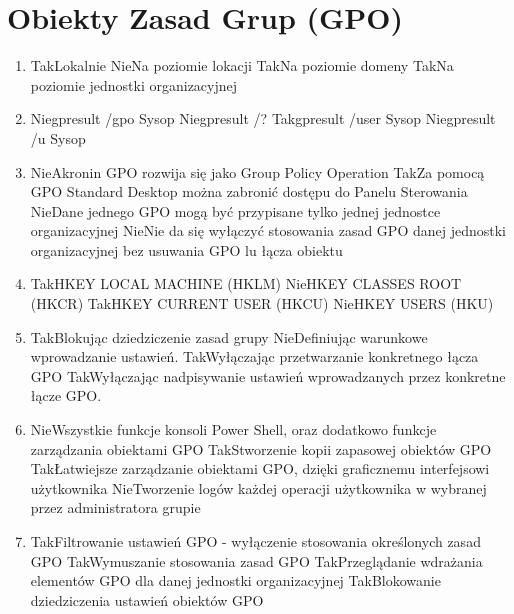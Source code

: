 \newpage
\section{Obiekty Zasad Grup (GPO)}
	\begin{enumerate}
		\item {}%
		{Tak}{Lokalnie}%
		{Nie}{Na poziomie lokacji}%
		{Tak}{Na poziomie domeny}%
		{Tak}{Na poziomie jednostki organizacyjnej}%
		
		\item {}%
		{Nie}{gpresult /gpo Sysop}%
		{Nie}{gpresult /?}%
		{Tak}{gpresult /user Sysop}%
		{Nie}{gpresult /u Sysop}
		
		\item {}%
		{Nie}{Akronin GPO rozwija się jako Group Policy Operation}%
		{Tak}{Za pomocą GPO Standard Desktop można zabronić dostępu do Panelu Sterowania}%
		{Nie}{Dane jednego GPO mogą być przypisane tylko jednej jednostce organizacyjnej}%
		{Nie}{Nie da się wyłączyć stosowania zasad GPO danej jednostki organizacyjnej bez usuwania GPO lu łącza obiektu}
		
		\item {}%
		{Tak}{HKEY LOCAL MACHINE (HKLM)}%
		{Nie}{HKEY CLASSES ROOT (HKCR)}%
		{Tak}{HKEY CURRENT USER (HKCU)}%
		{Nie}{HKEY USERS (HKU)}
		
		\item {}%
		{Tak}{Blokując dziedziczenie zasad grupy}%
		{Nie}{Definiując warunkowe wprowadzanie ustawień.}%
		{Tak}{Wyłączając przetwarzanie konkretnego łącza GPO}%
		{Tak}{Wyłączając nadpisywanie ustawień wprowadzanych przez konkretne łącze GPO.}
		
		\item {}%
		{Nie}{Wszystkie funkcje konsoli Power Shell, oraz dodatkowo funkcje zarządzania obiektami GPO}%
		{Tak}{Stworzenie kopii zapasowej obiektów GPO}%
		{Tak}{Łatwiejsze zarządzanie obiektami GPO, dzięki graficznemu interfejsowi użytkownika}%
		{Nie}{Tworzenie logów każdej operacji użytkownika w wybranej przez administratora grupie}
		
		\item {}%
		{Tak}{Filtrowanie ustawień GPO - wyłączenie stosowania określonych zasad GPO}%
		{Tak}{Wymuszanie stosowania zasad GPO}%
		{Tak}{Przeglądanie wdrażania elementów GPO dla danej jednostki organizacyjnej}%
		{Tak}{Blokowanie dziedziczenia ustawień obiektów GPO}
		

\end{enumerate}
